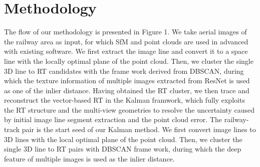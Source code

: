 \section{Methodology}

The flow of our methodology is presented in Figure 1.
We take aerial images of the railway area as input,
for which SfM and point clouds are used in advanced with existing software.
We first extract the image line and convert it to a space line with the locally optimal plane of the point cloud.
Then,
we cluster the single 3D line to RT candidates with the frame work derived from DBSCAN,  
during which the texture information of multiple images extracted from ResNet is used as one of the inlier distance.
Having obtained the RT cluster, 
we then trace and reconstruct the vector-based RT in the Kalman framwork,
which fully exploits the RT structure and the multi-view geometries to resolve the uncertainty caused by initial image line segment extraction and the point cloud error.
The railway-track pair is the start seed of our Kalman method.
We first convert image lines to 3D lines with the local optimal plane of the point cloud.
Then,
we cluster the single 3D line to RT pairs with DBSCAN frame work,  
during which the deep feature of multiple images is used as the inlier distance.





